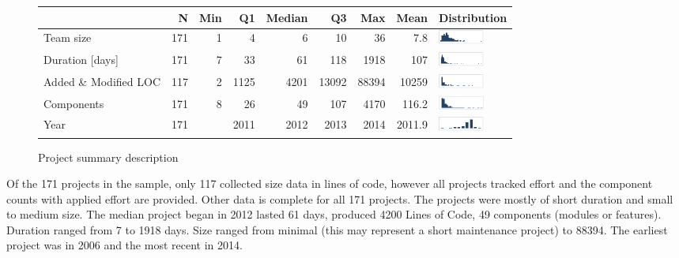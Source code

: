 \documentclass[smallcondensed]{svjour3}
\begin{document}
 \begin{figure}[ht]
\scriptsize
\centering
\begin{tabular}{lrrrrrrrl}
                                                                   & N   & Min & Q1   & Median & Q3    & Max   & Mean   &  Distribution \\\hline
Team size                                                          & 171 & 1   & 4    & 6      & 10    & 36    &  7.8    &  \includegraphics[width=15mm]{team_size.png} \\ 
Duration {[}days{]}                                                & 171 & 7   & 33   & 61     & 118   & 1918  & 107    & \includegraphics[width=15mm]{duration.png} \\
Added \& Modified LOC                                                 & 117 & 2   & 1125 & 4201   & 13092 & 88394 & 10259  & \includegraphics[width=15mm]{LOC.png} \\
Components                                                         & 171 & 8   & 26   & 49     & 107   & 4170  & 116.2  & \includegraphics[width=15mm]{components.png} \\
Year                                                               & 171 &     & 2011 & 2012   & 2013  & 2014  & 2011.9 & \includegraphics[width=15mm]{year.png}
\end{tabular}

\caption{Project summary description}
\label{fig:Project-descriptive-stats}
\end{figure}
 
 
 Of the 171 projects in the sample, only 117 collected size data in lines of code, however all projects tracked effort and  the component counts with applied effort are provided. Other data is complete for all 171 projects. The projects were mostly of short duration and small to medium size. The median project began in 2012 lasted 61 days, produced 4200 Lines of Code, 49 components (modules or features). Duration ranged from 7 to 1918 days. Size ranged from minimal (this may represent a short maintenance project) to 88394. The earliest project was in 2006 and the most recent in 2014. 
 
\end{document}
